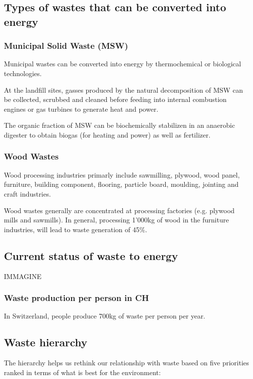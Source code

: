 \documentclass{article}
\begin{document}
\subsection{Types of wastes that can be converted into energy}
\subsubsection{Municipal Solid Waste (MSW)}
Municipal wastes can be converted into energy by thermochemical or biological technologies.

At the landfill sites, gasses produced by the natural decomposition of MSW can be collected,
scrubbed and cleaned before feeding into internal combustion engines or gas turbines to
generate heat and power.

The organic fraction of MSW can be biochemically stabilizen in an anaerobic digester to
obtain biogas (for heating and power) as well as fertilizer.

\subsubsection{Wood Wastes}
Wood processing industries primarly include sawmilling, plywood, wood panel, furniture,
building component, flooring, particle board, moulding, jointing and craft industries.

Wood wastes generally are concentrated at processing factories (e.g. plywood mills and
sawmills). In general, processing 1'000kg of wood in the furniture industries, will lead to
waste generation of 45\%.



\subsection{Current status of waste to energy}
IMMAGINE

\subsubsection{Waste production per person in CH}
In Switzerland, people produce 700kg of waste per person per year.

\subsection{Waste hierarchy}
The hierarchy helps us rethink our relationship with waste based on
five priorities ranked in terms of what is best for the environment:
\end{document}
